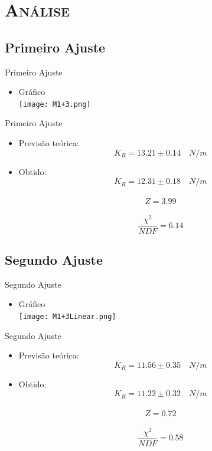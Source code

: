 \documentclass[xcolor=x11names,compress]{beamer}
\renewcommand{\(}{\begin{columns}}
\renewcommand{\)}{\end{columns}}
\newcommand{\<}[1]{\begin{column}{#1}}
\renewcommand{\>}{\end{column}}
\begin{document}

\section{\scshape Análise}


\subsection{Primeiro Ajuste}

\begin{frame}{Primeiro Ajuste}
	\begin{itemize}
		\item Gráfico\\
			\texttt{[image: M1+3.png]}
	\end{itemize}
\end{frame}


\begin{frame}{Primeiro Ajuste}
	\begin{itemize}
		\item Previsão teórica: \[K_{R} = 13.21 \pm 0.14 \quad N/m\] 
		\item Obtido: \[K_{R} = 12.31 \pm 0.18 \quad N/m\]\\
			\[Z = 3.99\]\\
			\[\frac{\chi^{2}}{NDF} = 6.14\]
	\end{itemize}
\end{frame}



\subsection{Segundo Ajuste}

\begin{frame}{Segundo Ajuste}
	\begin{itemize}
		\item Gráfico\\
			\texttt{[image: M1+3Linear.png]}
	\end{itemize}
\end{frame}


\begin{frame}{Segundo Ajuste}
	\begin{itemize}
		\item Previsão teórica: \[K_{R} = 11.56 \pm 0.35 \quad N/m\] 
		\item Obtido: \[K_{R} = 11.22 \pm 0.32 \quad N/m\]\\
			\[Z = 0.72\]\\
			\[\frac{\chi^{2}}{NDF} = 0.58\]
	\end{itemize}
\end{frame}
\end{document}
